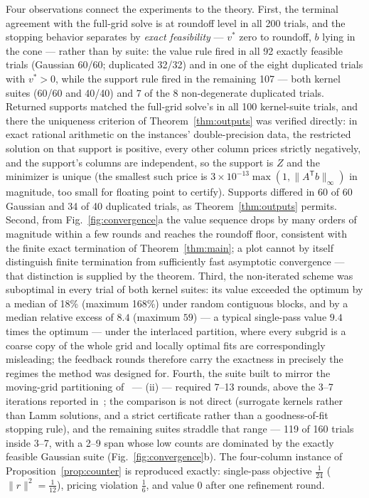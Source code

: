 \documentclass[pdflatex,sn-mathphys-num]{sn-jnl}
\theoremstyle{thmstyleone}
\theoremstyle{thmstyletwo}
\newcommand{\T}{{\mathsf T}}
\begin{document}
Four observations connect the experiments to the theory. First, the
terminal agreement with the full-grid solve is at roundoff level in
all 200 trials, and the stopping behavior separates by \emph{exact
feasibility} --- $v^*$ zero to roundoff, $b$ lying in the cone ---
rather than by suite: the value rule fired in all 92
exactly feasible trials (Gaussian 60/60; duplicated 32/32) and in one
of the eight duplicated trials with $v^*>0$, while the support rule
fired in the remaining 107 --- both kernel suites (60/60 and 40/40)
and 7 of the 8 non-degenerate duplicated trials. Returned supports
matched the full-grid solve's in all 100 kernel-suite trials, and there
the uniqueness criterion of Theorem~\ref{thm:outputs} was verified
directly: in exact rational arithmetic on the instances'
double-precision data, the restricted solution on that support is
positive, every other column prices strictly negatively, and the
support's columns are independent, so the support is $Z$ and the
minimizer is unique (the smallest such price is
$3\times10^{-13}\max(1,\lVert A^{\T}b\rVert_\infty)$ in magnitude, too
small for floating point to certify). Supports differed in 60 of 60
Gaussian and 34 of 40 duplicated trials, as Theorem~\ref{thm:outputs}
permits. Second, from Fig.~\ref{fig:convergence}a the value sequence
drops by many orders of magnitude within a few rounds and reaches the
roundoff floor, consistent with the finite exact termination of
Theorem~\ref{thm:main}; a plot cannot by itself distinguish finite
termination from sufficiently fast asymptotic convergence --- that
distinction is supplied by the theorem. Third, the non-iterated scheme
was suboptimal in every trial of both kernel suites: its value exceeded
the optimum by a median of 18\% (maximum 168\%) under random contiguous
blocks, and by a median relative excess of $8.4$ (maximum $59$) ---
a typical single-pass value $9.4$ times the optimum --- under the
interlaced partition, where every subgrid is a coarse copy of the whole
grid and locally optimal fits are correspondingly misleading; the
feedback rounds therefore carry the exactness in precisely the regimes
the method was designed for. Fourth, the suite built to mirror the
moving-grid partitioning of~\cite{brookes2006} --- (ii) --- required
7--13 rounds, above the 3--7 iterations reported
in~\cite{brookes2006}; the comparison is not direct (surrogate kernels
rather than Lamm solutions, and a strict certificate rather than a
goodness-of-fit stopping rule), and the remaining suites straddle
that range --- 119 of 160 trials inside 3--7, with a 2--9 span whose
low counts are dominated by the exactly feasible Gaussian suite
(Fig.~\ref{fig:convergence}b). The four-column instance of
Proposition~\ref{prop:counter} is reproduced exactly: single-pass
objective $\tfrac1{24}$ ($\lVert r\rVert^2=\tfrac1{12}$), pricing
violation $\tfrac16$, and value $0$ after one refinement round.
\end{document}
